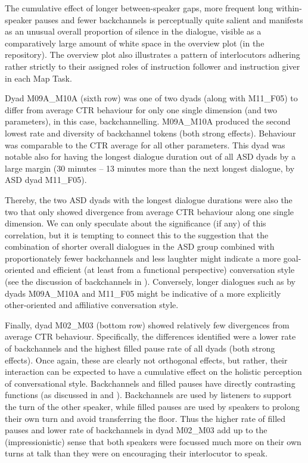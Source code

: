 The cumulative effect of longer between-speaker gaps, more frequent long within-speaker pauses and fewer backchannels is perceptually quite salient and manifests as an unusual overall proportion of silence in the dialogue, visible as a comparatively large amount of white space in the overview plot  (in the repository). The overview plot also illustrates a pattern of interlocutors adhering rather strictly to their assigned roles of instruction follower and instruction giver in each Map Task.

Dyad M09A\_M10A (sixth row) was one of two dyads (along with M11\_F05) to differ from average CTR behaviour for only one single dimension (and two parameters), in this case, backchannelling. M09A\_M10A produced the second lowest rate and diversity of backchannel tokens (both strong effects). Behaviour was comparable to the CTR average for all other parameters. This dyad was notable also for having the longest dialogue duration out of all ASD dyads by a large margin (30 minutes -- 13 minutes more than the next longest dialogue, by ASD dyad M11\_F05).

Thereby, the two ASD dyads with the longest dialogue durations were also the two that only showed divergence from average CTR behaviour along one single dimension. We can only speculate about the significance (if any) of this correlation, but it is tempting to connect this to the suggestion that the combination of shorter overall dialogues in the ASD group combined with proportionately fewer backchannels and less laughter might indicate a more goal-oriented and efficient (at least from a functional perspective) conversation style (see the discussion of backchannels in ). Conversely, longer dialogues such as by dyads M09A\_M10A and M11\_F05 might be indicative of a more explicitly other-oriented and affiliative conversation style.

Finally, dyad M02\_M03 (bottom row) showed relatively few divergences from average CTR behaviour. Specifically, the differences identified were a lower rate of backchannels and the highest filled pause rate of all dyads (both strong effects). Once again, these are clearly not orthogonal effects, but rather, their interaction can be expected to have a cumulative effect on the holistic perception of conversational style. Backchannels and filled pauses have directly contrasting functions (as discussed in  and ). Backchannels are used by listeners to support the turn of the other speaker, while filled pauses are used by speakers to prolong their own turn and avoid transferring the floor. Thus the higher rate of filled pauses and lower rate of backchannels in dyad M02\_M03 add up to the (impressionistic) sense that both speakers were focussed much more on their own turns at talk than they were on encouraging their interlocutor to speak.


